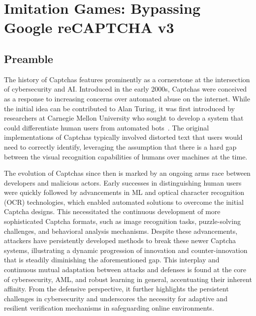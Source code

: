 \chapter{Imitation Games: Bypassing Google reCAPTCHA v3}\label{ch:recaptcha}

\section*{Preamble}

The history of Captchas features prominently as a cornerstone at the intersection of cybersecurity and \gls{AI}.
Introduced in the early 2000s, Captchas were conceived as a response to increasing concerns over automated abuse on the internet.
While the initial idea can be contributed to Alan Turing, it was first introduced by researchers at Carnegie Mellon University who sought to develop a system that could differentiate human users from automated bots~\cite{von2003captcha}.
The original implementations of Captchas typically involved distorted text that users would need to correctly identify, leveraging the assumption that there is a hard gap between  the visual recognition capabilities of humans over machines at the time.

The evolution of Captchas since then is marked by an ongoing arms race between developers and malicious actors.
Early successes in distinguishing human users were quickly followed by advancements in \gls{ML} and optical character recognition (OCR) technologies, which enabled automated solutions to overcome the initial Captcha designs.
This necessitated the continuous development of more sophisticated Captcha formats, such as image recognition tasks, puzzle-solving challenges, and behavioral analysis mechanisms.
Despite these advancements, attackers have persistently developed methods to break these newer Captcha systems, illustrating a dynamic progression of innovation and counter-innovation that is steadily diminishing the aforementioned gap.
This interplay and continuous mutual adaptation between attacks and defenses is found at the core of cybersecurity, \gls{AML}, and robust learning in general, accentuating their inherent affinity.
From the defensive perspective, it further highlights the persistent challenges in cybersecurity and underscores the necessity for adaptive and resilient verification mechanisms in safeguarding online environments.

